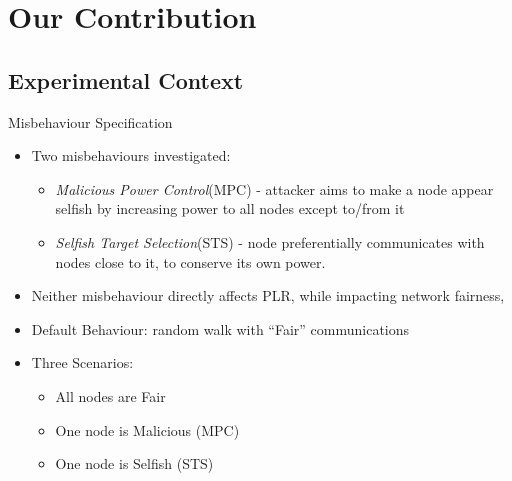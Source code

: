\documentclass{beamer}
\begin{document}
\section{Our Contribution}

\subsection{Experimental Context}

\begin{frame}{Misbehaviour Specification}
  \begin{itemize}
    \item Two misbehaviours investigated:
      \begin{itemize}
        \item \emph{Malicious Power Control}(MPC) - attacker aims to make a node appear selfish by increasing power to all nodes except to/from it
        \item \emph{Selfish Target Selection}(STS) - node preferentially communicates with nodes close to it, to conserve its own power.
      \end{itemize}
    \item Neither misbehaviour \alert{directly} affects PLR, while impacting network fairness,

    \item Default Behaviour: random walk with ``Fair'' communications

    \item Three Scenarios:
      \begin{itemize}
        \item All nodes are Fair
        \item One node is Malicious (MPC)
        \item One node is Selfish (STS)
      \end{itemize}
  \end{itemize}

\end{frame}
\end{document}
